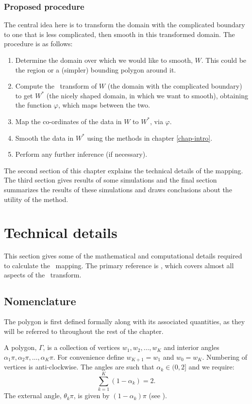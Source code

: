 \subsubsection{Proposed procedure}

The central idea here is to transform the domain with the complicated boundary to one that is less complicated, then smooth in this transformed domain. The procedure is as follows:

\begin{enumerate}
\item Determine the domain over which we would like to smooth, $W$. This could be the region or a (simpler) bounding polygon around it.
\item Compute the \sch\ transform of $W$ (the domain with the complicated boundary) to get $W^*$ (the nicely shaped domain, in which we want to smooth), obtaining the function $\varphi$, which maps between the two.
\item Map the co-ordinates of the data in $W$ to $W^*$, via $\varphi$.
\item Smooth the data in $W^*$ using the methods in chapter \ref{chap-intro}.
\item Perform any further inference (if necessary).
\end{enumerate}

The second section of this chapter explains the technical details of the mapping. The third section gives results of some simulations and the final section summarizes the results of these simulations and draws conclusions about the utility of the method.

\section{Technical details}

This section gives some of the mathematical and computational details required to calculate the \sch\ mapping. The primary reference is , which covers almost all aspects of the \sch\ transform.

\subsection{Nomenclature}
\label{sc-nomen}

The polygon is first defined formally along with its associated quantities, as they will be referred to throughout the rest of the chapter.

A polygon, $\Gamma$, is a collection of vertices $w_1, w_2,\ldots,w_K$ and interior angles $\alpha_1\pi, \alpha_2\pi, \ldots, \alpha_K\pi$. For convenience define $w_{K+1} = w_1$ and $w_0=w_K$. Numbering of vertices is anti-clockwise. The angles are such that $\alpha_k \in (0,2]$ and we require:
\begin{equation}
\sum_{k=1}^K (1-\alpha_k) = 2.
\end{equation}
The external angle, $\theta_k\pi$, is given by $(1-\alpha_k)\pi$ (see ). 

